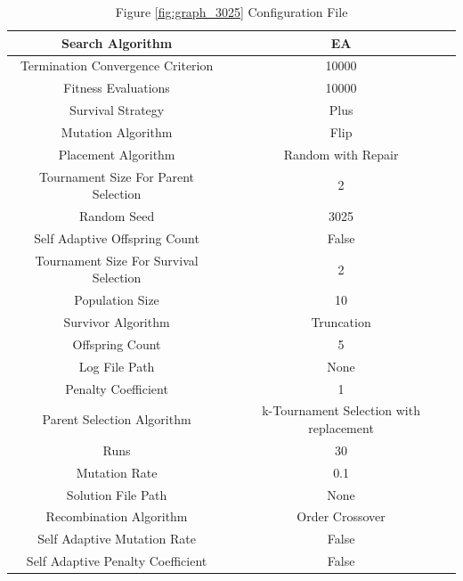 \documentclass{standalone}
\begin{document}
\begin{table}[!htb]
	\centering
	\caption{Figure \ref{fig:graph_3025} Configuration File}
	\label{tab:graph_3025}
	\begin{tabular}{| c | c |}
		\hline
		Search Algorithm		& EA		 \\
		\hline
		Termination Convergence Criterion		& 10000		 \\
		\hline
		Fitness Evaluations		& 10000		 \\
		\hline
		Survival Strategy		& Plus		 \\
		\hline
		Mutation Algorithm		& Flip		 \\
		\hline
		Placement Algorithm		& Random with Repair		 \\
		\hline
		Tournament Size For Parent Selection		& 2		 \\
		\hline
		Random Seed		& 3025		 \\
		\hline
		Self Adaptive Offspring Count		& False		 \\
		\hline
		Tournament Size For Survival Selection		& 2		 \\
		\hline
		Population Size		& 10		 \\
		\hline
		Survivor Algorithm		& Truncation		 \\
		\hline
		Offspring Count		& 5		 \\
		\hline
		Log File Path		& None		 \\
		\hline
		Penalty Coefficient		& 1		 \\
		\hline
		Parent Selection Algorithm		& k-Tournament Selection with replacement		 \\
		\hline
		Runs		& 30		 \\
		\hline
		Mutation Rate		& 0.1		 \\
		\hline
		Solution File Path		& None		 \\
		\hline
		Recombination Algorithm		& Order Crossover		 \\
		\hline
		Self Adaptive Mutation Rate		& False		 \\
		\hline
		Self Adaptive Penalty Coefficient		& False		 \\
		\hline
	\end{tabular}
\end{table}
\end{document}
